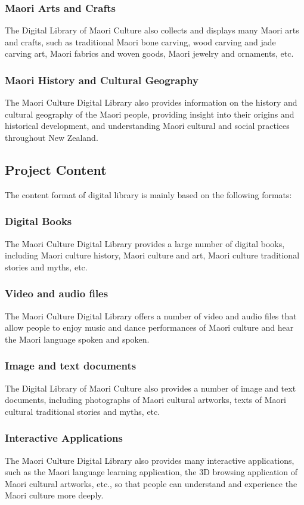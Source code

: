 \subsubsection{Maori Arts and Crafts}
The Digital Library of Maori Culture also collects and displays many Maori arts and crafts, such as traditional Maori bone carving, wood carving and jade carving art, Maori fabrics and woven goods, Maori jewelry and ornaments, etc.

\subsubsection{Maori History and Cultural Geography}
The Maori Culture Digital Library also provides information on the history and cultural geography of the Maori people, providing insight into their origins and historical development, and understanding Maori cultural and social practices throughout New Zealand.

\subsection{Project Content}
The content format of digital library is mainly based on the following formats:

\subsubsection{Digital Books}
The Maori Culture Digital Library provides a large number of digital books, including Maori culture history, Maori culture and art, Maori culture traditional stories and myths, etc.

\subsubsection{Video and audio files}
The Maori Culture Digital Library offers a number of video and audio files that allow people to enjoy music and dance performances of Maori culture and hear the Maori language spoken and spoken.

\subsubsection{Image and text documents}
The Digital Library of Maori Culture also provides a number of image and text documents, including photographs of Maori cultural artworks, texts of Maori cultural traditional stories and myths, etc.

\subsubsection{Interactive Applications}
The Maori Culture Digital Library also provides many interactive applications, such as the Maori language learning application, the 3D browsing application of Maori cultural artworks, etc., so that people can understand and experience the Maori culture more deeply.

